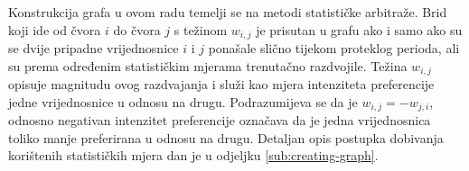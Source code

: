 \documentclass[lmodern, utf8, diplomski, numeric]{fer}
\begin{document}
  
  Konstrukcija grafa u ovom radu temelji se na metodi statističke arbitraže.
  Brid koji ide od čvora $i$ do čvora $j$ s težinom $w_{i,j}$ je prisutan u grafu ako i samo ako su se dvije pripadne vrijednosnice $i$ i $j$ ponašale slično tijekom proteklog perioda, ali su prema određenim statističkim mjerama trenutačno razdvojile.
  Težina $w_{i,j}$ opisuje magnitudu ovog razdvajanja i služi kao mjera intenziteta preferencije jedne vrijednosnice u odnosu na drugu.
  Podrazumijeva se da je $w_{i,j} = -w_{j,i}$, odnosno negativan intenzitet preferencije označava da je jedna vrijednosnica toliko manje preferirana u odnosu na drugu.
  Detaljan opis postupka dobivanja korištenih statističkih mjera dan je u odjeljku \ref{sub:creating-graph}.
    
\end{document}

